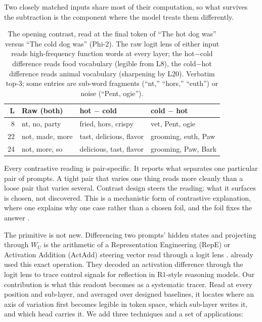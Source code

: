\documentclass[11pt]{article}
\newcommand{\WU}{W_U}
\begin{document}
Two closely matched inputs share most of their computation, so what survives
the subtraction is the component where the model treats them differently.

\begin{table}[htbp]
\centering
\small
\begin{tabular}{@{}rlll@{}}
\toprule
L & Raw (both) & hot $-$ cold & cold $-$ hot \\
\midrule
8  & nt, no, party   & fried, hors, crispy     & vet, Pent, ogie \\
22 & not, made, more & tast, delicious, flavor & grooming, euth, Paw \\
24 & not, more, so   & delicious, tast, flavor & grooming, Paw, Bark \\
\bottomrule
\end{tabular}
\caption{The opening contrast, read at the final token of ``The hot dog was''
versus ``The cold dog was'' (Phi-2). The raw logit lens of either input reads
high-frequency function words at every layer; the hot$-$cold difference reads
food vocabulary (legible from L8), the cold$-$hot difference reads animal
vocabulary (sharpening by L20). Verbatim top-3; some entries are sub-word
fragments (``nt,'' ``hors,'' ``euth'') or noise (``Pent, ogie'').}
\label{tab:hotdog}
\end{table}



Every contrastive reading is pair-specific. It reports what separates one
particular pair of prompts. A tight pair that varies one thing reads more
cleanly than a loose pair that varies several. Contrast design steers the
reading: what it surfaces is chosen, not discovered. This is a mechanistic form
of contrastive explanation, where one explains why one case rather than a
chosen foil, and the foil fixes the answer \citep{vanfraassen1980,lipton1990}.

The primitive is not new. Differencing two prompts' hidden states and
projecting through $\WU$ is the arithmetic of a Representation Engineering (RepE)
or Activation Addition (ActAdd) steering vector \citep{zou2023,turner2023} read
through a logit lens \citep{nostalgebraist2020}.
\citet{du2026} already used this exact operation. They decoded an activation
difference through the logit lens to trace control signals for reflection in
R1-style reasoning models. Our contribution is what this readout becomes as a
systematic tracer. Read at every position and sub-layer, and averaged over
designed baselines, it locates where an axis of variation first becomes legible
in token space, which sub-layer writes it, and which head carries it. We add
three techniques and a set of applications:
\end{document}
